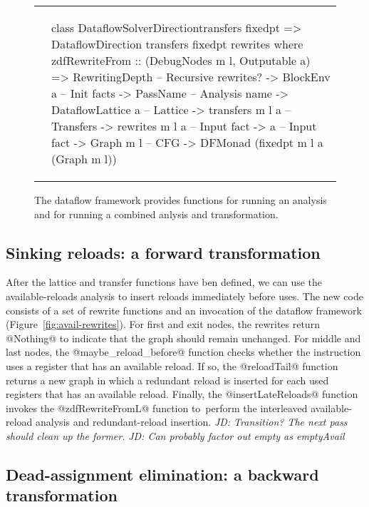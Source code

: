 \documentclass[blockstyle,preprint,nocopyrightspace]{sigplanconf}
\newcommand{\authornote}[1]{{\em #1}}
\newcommand{\john}[1]{\authornote{JD: #1}}
\newcommand\figref[1]{Figure~\ref{fig:#1}}
\newcommand\figlabel[1]{\label{fig:#1}}
\begin{document}
\begin{figure*}
\begin{tabular}{ll}
\begin{minipage}{3.4in}
\end{minipage}
& 
\begin{minipage}{3.4in}
\begin{code}
class DataflowSolverDirectiontransfers fixedpt =>
      DataflowDirection
        transfers fixedpt rewrites where
  zdfRewriteFrom :: (DebugNodes m l, Outputable a)
    => RewritingDepth    -- Recursive rewrites?
    -> BlockEnv a        -- Init facts
    -> PassName          -- Analysis name
    -> DataflowLattice a -- Lattice
    -> transfers m l a   -- Transfers
    -> rewrites m l a    -- Input fact
    -> a                 -- Input fact
    -> Graph m l         -- CFG
    -> DFMonad (fixedpt m l a (Graph m l))
\end{code}
\end{minipage}
\end{tabular}
\caption{The dataflow framework provides functions for running an analysis
  and for running a combined anlysis and transformation.}
\figlabel{framework-fns}
\end{figure*}

\subsection{Sinking reloads: a forward transformation}


After the lattice and transfer functions have ben defined,
we can use the available-reloads analysis to insert reloads
immediately before uses.
The new code consists of a set of rewrite functions and an invocation
of the dataflow framework (\figref{avail-rewrites}).
For first and exit nodes, the rewrites return @Nothing@ to indicate
that the graph should remain unchanged.
For middle and last nodes, the @maybe_reload_before@ function
checks whether the instruction uses a register that has an available reload.
If so, the @reloadTail@ function returns a new graph
in which a redundant reload is inserted for each used registers
that has an available reload.
Finally, the @insertLateReloads@ function invokes the @zdfRewriteFromL@ function
to~perform the interleaved available-reload analysis
and redundant-reload insertion.
\john{Transition? The next pass should clean up the former.}
\john{Can probably factor out empty as emptyAvail}

\subsection{Dead-assignment elimination: a backward transformation}
\end{document}

